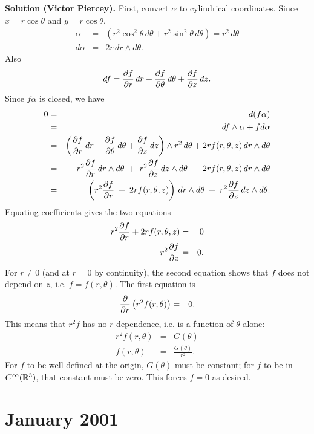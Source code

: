 \documentclass[10pt]{article}
\numberwithin{equation}{subsection}
\begin{document}
\textbf{Solution (Victor Piercey).}  First, convert $\alpha$ to cylindrical
coordinates.  Since $x=r\cos\theta$ and $y=r\cos\theta$,
\begin{eqnarray*}
	\alpha &=& (r^2\cos^2\theta \,d\theta + r^2\sin^2\theta \,d\theta)
	= r^2\, d\theta \\
	d\alpha &=& 2r\, dr \wedge d\theta.
\end{eqnarray*}
Also
$$
	df = \frac{\partial f}{\partial r}\,dr
	+ \frac{\partial f}{\partial\theta}\,d\theta
	+ \frac{\partial f}{\partial z}\,dz.
$$
Since $f\alpha$ is closed, we have
\begin{eqnarray*}
	0 &=& d(f\alpha) \\
	&=& df\wedge \alpha + fd\alpha \\
%
	&=& \left(
		\frac{\Df}{\Dr}\,dr +
		\frac{\Df}{\D\theta}\,d\theta +
		\frac{\Df}{\Dz}\,dz
		\right) \wedge r^2\, d\theta
	+ 2 r f(r,\theta,z) \,dr \wedge d\theta \\
%
	&=& r^2 \frac{\Df}{\Dr}\,dr \wedge d\theta
	\;+\; r^2 \frac{\Df}{\Dz}\,dz \wedge d\theta
	\;+\; 2 r f(r,\theta,z) \,dr \wedge d\theta \\
%
	&=& \left(r^2 \frac{\Df}{\Dr}
		\;+\; 2 r f(r,\theta,z) \right) \,dr \wedge d\theta
	\;+\; r^2 \frac{\Df}{\Dz}\,dz \wedge d\theta.
\end{eqnarray*}
Equating coefficients gives the two equations
\begin{eqnarray*}
	r^2 \frac{\partial f}{\partial r} + 2rf(r,\theta,z) &=& 0 \\
	r^2 \frac{\partial f}{\partial z} &=& 0.
\end{eqnarray*}
For $r \ne 0$ (and at $r=0$ by continuity), the second equation shows that $f$
does not depend on $z$, i.e. $f=f(r,\theta)$.  The first equation is
\begin{eqnarray*}
	\frac{\partial}{\partial r} \left( r^2 f(r,\theta) \right) &=& 0.
\end{eqnarray*}
This means that $r^2f$ has no $r$-dependence, i.e. is a function of $\theta$
alone:
\begin{eqnarray*}
	r^2f(r,\theta) &=& G(\theta) \\
	f(r,\theta) &=& \frac{G(\theta)}{r^2}.
\end{eqnarray*}
For $f$ to be well-defined at the origin, $G(\theta)$ must be constant; for $f$
to be in $C^\infty(\mathbb{R}^3)$, that constant must be zero.  This forces $f=0$ as
desired.

\newpage
\section{January 2001}
\end{document}
